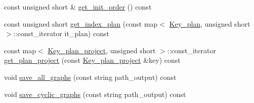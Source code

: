\begin{DoxyCompactItemize}
\item 
const unsigned short \& \hyperlink{classgenevalmag_1_1Builder__plans_a52157d41e3998900e61ab90eda9e4e91}{get\_\-init\_\-order} () const 
\item 
const unsigned short \hyperlink{classgenevalmag_1_1Builder__plans_a7748b68109c6c6aa805bbd1886dd6029}{get\_\-index\_\-plan} (const map$<$ \hyperlink{structgenevalmag_1_1k__plan}{Key\_\-plan}, unsigned short $>$::const\_\-iterator it\_\-plan) const 
\item 
const map$<$ \hyperlink{structgenevalmag_1_1k__p__project}{Key\_\-plan\_\-project}, unsigned short $>$::const\_\-iterator \hyperlink{classgenevalmag_1_1Builder__plans_a2aecc3840ac5d583959073e5d7657b34}{get\_\-plan\_\-project} (const \hyperlink{structgenevalmag_1_1k__p__project}{Key\_\-plan\_\-project} \&key) const 
\item 
void \hyperlink{classgenevalmag_1_1Builder__plans_a3b70a30427aa135641a75d0d42e23500}{save\_\-all\_\-graphs} (const string path\_\-output) const 
\item 
void \hyperlink{classgenevalmag_1_1Builder__plans_ac9502627f9433c4cab7d03678e507a66}{save\_\-cyclic\_\-graphs} (const string path\_\-output) const 
\end{DoxyCompactItemize}

